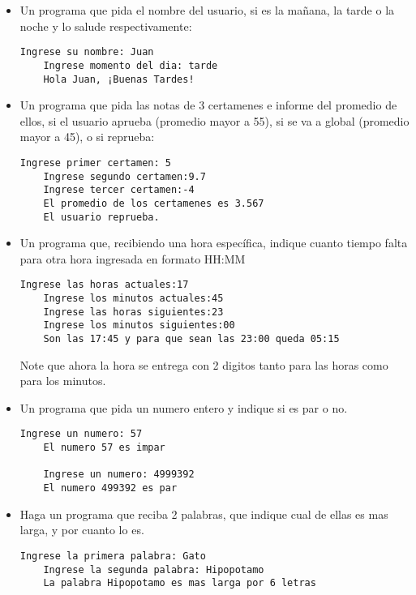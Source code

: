 \begin{itemize}
    \item Un programa que pida el nombre del usuario, si es la mañana, la tarde o la noche y lo salude respectivamente:
    \begin{lstlisting}[style=consola]
    Ingrese su nombre: Juan
    Ingrese momento del dia: tarde
    Hola Juan, ¡Buenas Tardes!
    \end{lstlisting}
    
    \item Un programa que pida las notas de 3 certamenes e informe del promedio de ellos, si el usuario aprueba (promedio
    mayor a 55), si se va a global (promedio mayor a 45), o si reprueba:
    \begin{lstlisting}[style=consola]
    Ingrese primer certamen: 5
    Ingrese segundo certamen:9.7
    Ingrese tercer certamen:-4
    El promedio de los certamenes es 3.567
    El usuario reprueba.
    \end{lstlisting}
    
    \item Un programa que, recibiendo una hora específica, indique cuanto tiempo falta para otra hora ingresada en formato HH:MM
    \begin{lstlisting}[style=consola]
    Ingrese las horas actuales:17
    Ingrese los minutos actuales:45
    Ingrese las horas siguientes:23
    Ingrese los minutos siguientes:00
    Son las 17:45 y para que sean las 23:00 queda 05:15 
    \end{lstlisting}
    Note que ahora la hora se entrega con 2 digitos tanto para las horas como para los minutos.
    
    \item Un programa que pida un numero entero y indique si es par o no.
    \begin{lstlisting}[style=consola]
    Ingrese un numero: 57
    El numero 57 es impar
    
    Ingrese un numero: 4999392
    El numero 499392 es par
    \end{lstlisting}
    \item Haga un programa que reciba 2 palabras, que indique cual de ellas es mas larga, y por cuanto lo es.
    \begin{lstlisting}[style=consola]
    Ingrese la primera palabra: Gato
    Ingrese la segunda palabra: Hipopotamo
    La palabra Hipopotamo es mas larga por 6 letras
    \end{lstlisting}
    

\end{itemize}
